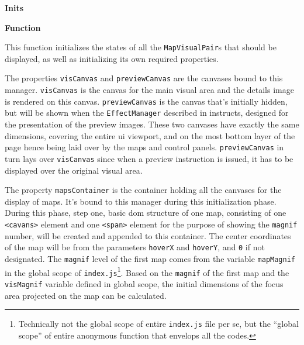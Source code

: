 \textbf{Inits}

\textbf{Function} 

This function initializes the states of all the \texttt{MapVisualPair}s that should be displayed, as well as initializing its own required properties.

The properties \texttt{visCanvas} and \texttt{previewCanvas} are the canvases bound to this manager. \texttt{visCanvas} is the canvas for the main visual area and the details image is rendered on this canvas. \texttt{previewCanvas} is the canvas that's initially hidden, but will be shown when the \texttt{EffectManager} described in  instructs, designed for the presentation of the preview images. These two canvases have exactly the same dimensions, covering the entire \gls{ui} viewport, and on the most bottom layer of the page hence being laid over by the \glspl{map} and control panels. \texttt{previewCanvas} in turn lays over \texttt{visCanvas} since when a preview instruction is issued, it has to be displayed over the original visual area.

The property \texttt{mapsContainer} is the container holding all the canvases for the display of \glspl{map}. It's bound to this manager during this initialization phase. During this phase, step one, basic \gls{dom} structure of one \gls{map}, consisting of one \texttt{<cavans>} element and one \texttt{<span>} element for the purpose of showing the \texttt{magnif} number, will be created and appended to this container. The center coordinates of the \gls{map} will be from the parameters \texttt{hoverX} and \texttt{hoverY}, and \texttt{0} if not designated. The \texttt{magnif} level of the first \gls{map} comes from the variable \texttt{mapMagnif} in the global scope of \texttt{index.js}\footnote{ Technically not the global scope of entire \texttt{index.js} file per se, but the ``global scope'' of entire anonymous function that envelops all the codes.}. Based on the \texttt{magnif} of the first \gls{map} and the \texttt{visMagnif} variable defined in global scope, the initial dimensions of the focus area projected on the \gls{map} can be calculated.

